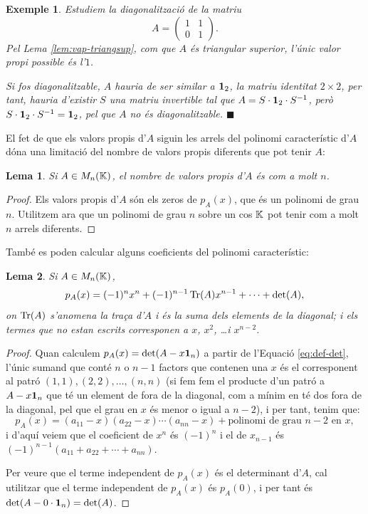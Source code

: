 \documentclass[
  11pt,
]{book}
\numberwithin{dummy}{section}
\theoremstyle{maincolornumbox}
\theoremstyle{blacknumex}
\newtheorem{exampleT}{Exemple}[chapter]
\theoremstyle{blacknumbox}
\theoremstyle{maincolornum}
\newtheorem{lemmaT}{Lema}[chapter]
\newenvironment{lemma}{\begin{pBox}\begin{lemmaT}}{\end{lemmaT}\end{pBox}}
\newenvironment{example}{\begin{exampleT}}{\hfill{\tiny\ensuremath{\blacksquare}}\end{exampleT}}
\newlength\esp
\begin{document}
\begin{example}
\protect\hypertarget{exm:mat1101}{}\label{exm:mat1101}Estudiem la diagonalització de la
matriu \[A=\begin{pmatrix}
1 &  1 \\ 0 & 1
\end{pmatrix}.\] Pel Lema
\ref{lem:vap-triangsup}, com que \(A\) és triangular superior,
l'únic valor propi possible és l'\(1\).

Si fos diagonalitzable, \(A\) hauria de ser similar a \(\mathbf{1}_2\), la matriu
identitat \(2\times 2\), per tant, hauria d'existir \(S\) una matriu
invertible tal que \(A=S\cdot\mathbf{1}_2\cdot S^{-1}\), però
\(S\cdot \mathbf{1}_2 \cdot S^{-1}=\mathbf{1}_2\), pel que \(A\) no és diagonalitzable.
\end{example}

El fet de que els valors propis d'\(A\) siguin les arrels del polinomi
característic d'\(A\) dóna una limitació del nombre de valors propis
diferents que pot tenir \(A\):

\begin{lemma}
Si \(A\in M_n(\mathbb{K})\), el nombre de valors propis d'\(A\) és com a molt \(n\).
\end{lemma}

\begin{proof}
Els valors propis d'\(A\) són els zeros de \(p_A(x)\), que és un
polinomi de grau \(n\). Utilitzem ara que un polinomi de grau \(n\) sobre un
cos \(\mathbb{K}\) pot tenir com a molt \(n\) arrels diferents.
\end{proof}

També es poden calcular alguns coeficients del polinomi característic:

\begin{lemma}
Si \(A\in M_n(\mathbb{K})\),
\[p_A(x)=(-1)^{n} x^n + (-1)^{n-1}\operatorname{Tr}(A) x^{n-1} + \cdots + \det(A) ,\]
on \(\operatorname{Tr}(A)\) s'anomena la traça d'\(A\) i és la suma dels elements de la
diagonal; i els termes que no estan escrits corresponen a \(x\), \(x^2\),
\ldots i \(x^{n-2}\).
\end{lemma}

\begin{proof}
Quan calculem \(p_A(x)=\det(A-x\mathbf{1}_n)\) a partir de l'Equació
\eqref{eq:def-det}, l'únic sumand que conté \(n\) o \(n-1\) factors que
contenen una \(x\) és el corresponent al patró \((1,1),(2,2),\dots, (n,n)\)
(si fem fem el producte d'un patró a \(A-x\mathbf{1}_n\) que té un element de fora
de la diagonal, com a mínim en té dos fora de la diagonal, pel que el
grau en \(x\) és menor o igual a \(n-2\)), i per tant, tenim que:
\[p_A(x)=(a_{11}-x)(a_{22}-x)\cdots(a_{nn}-x)+\text{polinomi de grau $n-2$ en $x$} ,\]
i d'aquí veiem que el coeficient de \(x^n\) és \((-1)^n\) i el de \(x_{n-1}\)
és \((-1)^{n-1}(a_{11}+a_{22}+\cdots + a_{nn})\).

Per veure que el terme independent de \(p_A(x)\) és el determinant d'\(A\),
cal utilitzar que el terme independent de \(p_A(x)\) és \(p_A(0)\), i per
tant és \(\det(A-0\cdot\mathbf{1}_n)=\det(A)\).
\end{proof}
\end{document}

